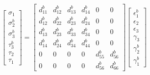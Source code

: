 \documentclass{article}
\begin{document}
\[
\begin{bmatrix}
\sigma_1 \\ \sigma_2^b \\ \sigma_3^b \\ \tau_3^b \\ \tau_2 \\ \tau_1
\end{bmatrix}
=
\begin{bmatrix}
d_{11}^b & d_{12}^b & d_{13}^b & d_{14}^b & 0 & 0 \\
d_{12}^b & d_{22}^b & d_{23}^b & d_{24}^b & 0 & 0 \\
d_{13}^b & d_{23}^b & d_{33}^b & d_{34}^b & 0 & 0 \\
d_{14}^b & d_{24}^b & d_{34}^b & d_{44}^b & 0 & 0 \\
0 & 0 & 0 & 0 & d_{55}^b & d_{56}^b \\
0 & 0 & 0 & 0 & d_{56}^b & d_{66}^b 
\end{bmatrix}
\begin{bmatrix}
\epsilon_1^b \\ \epsilon_2 \\ \epsilon_3 \\ \gamma_3\\ \gamma_2^b \\ \gamma_1^b
\end{bmatrix}
\]
\end{document}
